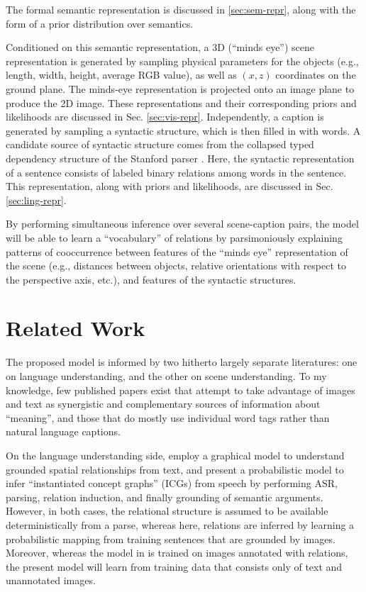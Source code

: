 \documentclass[12pt]{article}
\begin{document}
The formal semantic representation is discussed in \ref{sec:sem-repr}, along with the form of a prior distribution over semantics.

Conditioned on this semantic representation, a 3D (``minds eye'') scene representation is generated by sampling physical parameters for the objects (e.g., length, width, height, average RGB value), as well as $(x,z)$ coordinates on the ground plane.  The minds-eye representation is projected onto an image plane to produce the 2D image.  These representations and their corresponding priors and likelihoods are discussed in Sec. \ref{sec:vis-repr}.  Independently, a caption is generated by sampling a syntactic structure, which is then filled in with words.  A candidate source of syntactic structure comes from the collapsed typed dependency structure of the Stanford parser \citep{mcdm08b}.  Here, the syntactic representation of a sentence consists of labeled binary relations among words in the sentence.  This representation, along with priors and likelihoods, are discussed in Sec. \ref{sec:ling-repr}.

By performing simultaneous inference over several scene-caption pairs, the model will be able to learn a ``vocabulary'' of relations by parsimoniously explaining patterns of cooccurrence between features of the ``minds eye'' representation of the scene (e.g., distances between objects, relative orientations with respect to the perspective axis, etc.), and features of the syntactic structures.

\section{Related Work}
\label{sec:related-work}

The proposed model is informed by two hitherto largely separate literatures: one on language understanding, and the other on scene understanding.  To my knowledge, few published papers exist that attempt to take advantage of images and text as synergistic and complementary sources of information about ``meaning'', and those that do \citep{barnard2001learning, barnard2003matching} mostly use individual word tags rather than natural language captions.

On the language understanding side, \cite{Tellex2011approaching} employ a graphical model 
to understand grounded spatial relationships from text, and 
\cite{Makalic2008probabilistic} present a probabilistic model
to infer ``instantiated concept graphs'' (ICGs) from speech by
performing ASR, parsing, relation induction, and finally grounding of
semantic arguments.  However, in both cases, the relational structure
is assumed to be available deterministically from a parse,
whereas here, relations are inferred by learning a probabilistic
mapping from training sentences that are grounded by images.  Moreover, whereas the
model in \cite{Tellex2011approaching} is trained on images annotated with relations, the present model will learn from training data that consists only of text and unannotated images.
\end{document}
